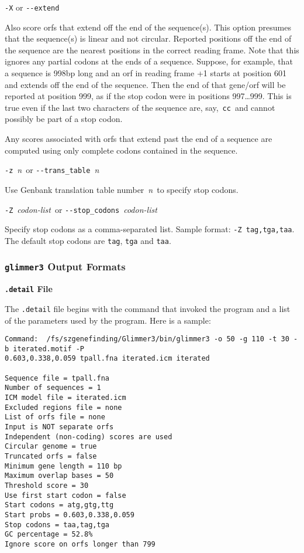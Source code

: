 \documentclass[fleqn,titlepage,11pt]{article}
\def\Desc#1{\,\mbox{\emph{#1}}\,}
\def\Pg#1{\texttt{#1}}
\begin{document}
\exdent
  \verb`-X` \enskip or \enskip \verb`--extend`

  Also score orfs that extend off the end of the sequence(s).  This
  option presumes that the sequence(s) is linear and not circular.
  Reported positions off the end of the sequence are the nearest
  positions in the correct reading frame.  Note that this ignores
  any partial codons at the ends of a sequence.  Suppose, for example,
  that a sequence is 998bp long and an orf in reading frame +1
  starts at position 601 and extends off the end of the sequence.
  Then the end of that gene/orf will be reported at position 999,
  as if the stop codon were in positions 997\ldots999.  This is true
  even if the last two characters of the sequence are, say, \,\verb`cc`\,
  and cannot possibly be part of a stop codon.

  Any scores associated with orfs that extend past the end of a
  sequence are computed using only complete codons contained in
  the sequence.
  
\exdent
  \verb`-z` \Desc{n} \enskip or \enskip \verb`--trans_table` \Desc{n}

  Use Genbank translation table number \Desc{n} to specify stop codons.

\exdent
  \verb`-Z` \Desc{codon-list} \enskip or \enskip \verb`--stop_codons` \Desc{codon-list}

  Specify stop codons as a comma-separated list.
  Sample format:  \verb`-Z tag,tga,taa`.
  The default stop codons are \Pg{tag}, \Pg{tga} and \Pg{taa}.
\el


\subsubsection{\Pg{glimmer3} Output Formats}

\smallskip
\noindent\textbf{\Pg{.detail} File}
\smallskip

The \Pg{.detail} file begins with the command that invoked the program and
a list of the parameters
used by the program.  Here is a sample:
\BSV
\begin{verbatim}
Command:  /fs/szgenefinding/Glimmer3/bin/glimmer3 -o 50 -g 110 -t 30 -b iterated.motif -P 
0.603,0.338,0.059 tpall.fna iterated.icm iterated

Sequence file = tpall.fna
Number of sequences = 1
ICM model file = iterated.icm
Excluded regions file = none
List of orfs file = none
Input is NOT separate orfs
Independent (non-coding) scores are used
Circular genome = true
Truncated orfs = false
Minimum gene length = 110 bp
Maximum overlap bases = 50
Threshold score = 30
Use first start codon = false
Start codons = atg,gtg,ttg
Start probs = 0.603,0.338,0.059
Stop codons = taa,tag,tga
GC percentage = 52.8%
Ignore score on orfs longer than 799
\end{verbatim}
\ESV
\end{document}

